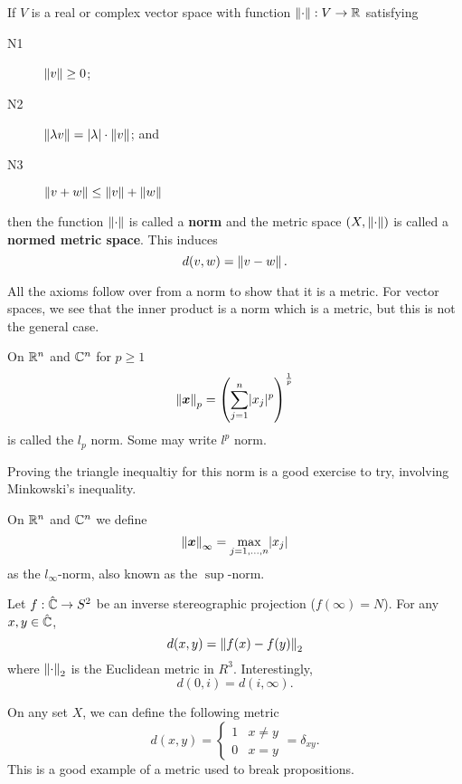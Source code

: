 \begin{definition}[Norm]
    If $V$ is a real or complex vector space with function $\left\lVert\cdot\right\rVert : V \to \mathbb{R}$ satisfying
    \begin{description}
        \item[N1] $\left\lVert v\right\rVert \geq 0$;
        \item[N2] $\left\lVert\lambda v\right\rVert = \lvert \lambda \rvert \cdot \left\lVert v\right\rVert$; and
        \item[N3] $\left\lVert v + w\right\rVert \leq \left\lVert v\right\rVert + \left\lVert w\right\rVert$
    \end{description}
    then the function $\left\lVert\cdot\right\rVert$ is called a \textbf{norm} and the metric space $(X, \left\lVert\cdot\right\rVert)$ is called a \textbf{normed metric space}. This induces
    \[ d(v, w) = \left\lVert v - w\right\rVert. \]
\end{definition}

All the axioms follow over from a norm to show that it is a metric. For vector spaces, we see that the inner product is a norm which is a metric, but this is not the general case.

\begin{example}[$l_p$-norms]
    On $\mathbb{R}^n$ and $\mathbb{C}^n$ for $p \geq 1$
    \[ \left\lVert\bm x\right\rVert_p = \left( \sum_{j = 1}^n \lvert x_j \rvert^p \right)^\frac 1p \]
    is called the $l_p$ norm. Some may write $l^p$ norm.
\end{example}

\begin{remark}
    Proving the triangle inequaltiy for this norm is a good exercise to try, involving Minkowski's inequality. %
\end{remark}

\begin{example}
    On $\mathbb{R}^n$ and $\mathbb{C}^n$ we define
    \[ \left\lVert\bm x\right\rVert_\infty = \max_{j = 1, \ldots, n} \lvert x_j \rvert \] as the $l_\infty$-norm, also known as the $\sup$-norm.
\end{example}

\begin{example}
    Let $f: \hat{\mathbb{C}} \to S^2$ be an inverse stereographic projection ($f(\infty) = N$). For any $x, y \in \hat{\mathbb{C}}$,
    \[ d(x, y) = \left\lVert f(x) - f(y)\right\rVert_2 \]
    where $\left\lVert\cdot\right\rVert_2$ is the Euclidean metric in $R^3$. Interestingly,
    \[ d(0, i) = d(i, \infty). \]
\end{example}

\begin{example}
    On any set $X$, we can define the following metric
    \[ d(x, y) = \begin{cases} 1 & x \neq y \\ 0 & x = y \end{cases} = \delta_{xy}. \]
    This is a good example of a metric used to break propositions.
\end{example}

